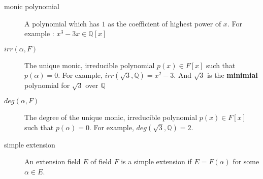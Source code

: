 \begin{description}
	\item[monic polynomial] A polynomial which has $1$ as the coefficient of highest power of $x$. For example : $x^3 - 3x \in \mathbb{Q}[x]$
	\item[$irr(\alpha,F)$] The unique monic, irreducible polynomial $p(x) \in F[x]$ such that $p(\alpha) = 0$. For example, $irr(\sqrt{3},\mathbb{Q}) = x^2-3$. And $\sqrt{3}$ is the \textbf{minimial} polynomial for $\sqrt{3}$ over $\mathbb{Q}$
	\item[$deg(\alpha,F)$] The degree of the unique monic, irreducible polynomial $p(x) \in F[x]$ such that $p(\alpha) = 0$. For example, $deg(\sqrt{3},\mathbb{Q}) = 2$.
	\item[simple extension] An extension field $E$ of field $F$ is a simple extension if $E = F(\alpha)$ for some $\alpha \in E$.
\end{description}


